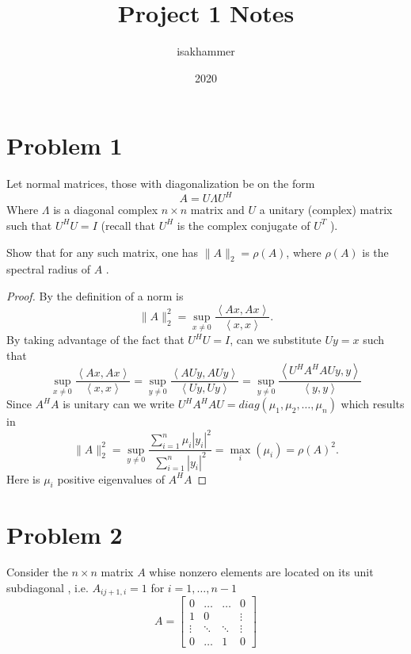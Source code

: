 \documentclass{article}
\title{Project 1 Notes}
\author{isakhammer }
\date{2020}
\theoremstyle{remark}
\newcommand{\newpara}
  {
  \vskip 0.4cm
  }
\begin{document}
\maketitle
\tableofcontents
\newpage

\newpage
\section{Problem 1}%
\label{sec:problem_1}

Let normal matrices, those with diagonalization be on the form \[
A = U \Lambda U^{H} 
\] 
Where $\Lambda $ is a diagonal complex $n\times n $ matrix and $U$ a unitary (complex) matrix such that $U ^{H} U = I$ (recall that $U^{H}$ is the complex conjugate of $U^{T}$ ).
\newpara
Show that for any such matrix, one has $\|A\|_{2} = \rho \left( A \right)$, where $\rho \left( A \right) $ is the spectral radius of $A$ .

\begin{proof}
  By the definition of a norm is \[
  \|A\|_{2}^{2} = \sup_{x \neq 0} \frac{\left<Ax, Ax \right>}{ \left<x,x \right>} .
  \] 
  By taking advantage of the fact that $U^{H} U = I$, can we substitute $Uy =  x$ such that \[
    \sup_{x \neq 0} \frac{\left<Ax, Ax \right>}{\left<x,x \right>}  = \sup_{y\neq 0}  \frac{\left<AU y, A U y \right>}{ \left<U y, Uy \right>} = \sup_{y \neq 0} \frac{\left<U^{H} A^{H} A U y,y \right>}{\left<y,y \right>} 
  \] 
   Since $A^{H} A $ is unitary can we write $U^{H} A^{H} A U = diag\left( \mu _{1} , \mu _{2}, \ldots, \mu _{n} \right)$ which results in \[
   \|A\|_{2}^{2} = \sup_{ y \neq 0}  \frac{\sum_{i=1}^{n}  \mu _{i} \left| y_{i} \right|^2}{ \sum_{i=1}^{n}  \left| y_{i} \right|^2}  = \max _{i} \left( \mu _{i} \right) = \rho \left( A \right)^2.
   \] 
   Here is $\mu _{i}$ positive eigenvalues of $A^{H} A$
\end{proof}
\newpage
\section{Problem 2}%
\label{sec:problem_2}

Consider the $n \times n $ matrix $A$ whise nonzero elements are located on its unit subdiagonal , i.e. $A_{ij+1, i} = 1$ for $i = 1, \ldots, n-1$\[
A = \begin{bmatrix} 
  0  &  \ldots  &  \ldots  & 0 \\
  1  &  0  &    & \vdots  \\
  \vdots   & \ddots   & \ddots   &  \vdots   \\
  0  &  \ldots     & 1  & 0 
\end{bmatrix} 
\] 
\end{document}
